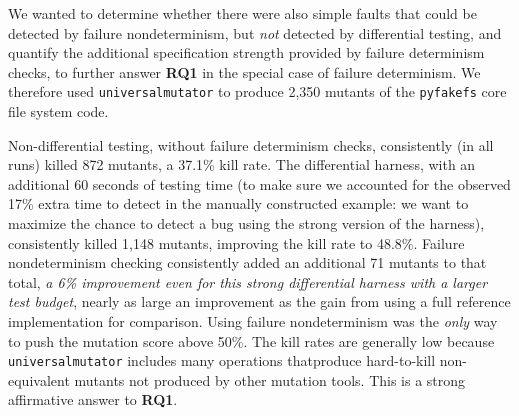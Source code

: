 {We wanted to determine whether there were also simple faults that
could be detected by failure nondeterminism, but \emph{not} detected
by differential testing, and quantify the additional specification
strength provided by failure determinism checks, to further answer
{\bf RQ1} in the special case of failure determinism.  We therefore used
{\tt universalmutator} \cite{RegExpMut} to produce 2,350 mutants of
the {\tt pyfakefs} core file system code.   %

Non-differential testing, without failure determinism checks,
consistently (in all runs) killed
872 mutants, a 37.1\% kill rate.
The differential harness, with an additional 60 seconds of testing
time (to make sure we accounted for the observed 17\%
extra time to detect in the manually constructed example: we want to
maximize the chance to detect a bug using the strong version of the harness), consistently killed 1,148 mutants, improving the kill rate to 48.8\%.  Failure
nondeterminism checking consistently added an
additional 71 mutants to that total, \emph{a 6\% improvement even for
this strong differential harness with a larger test budget}, nearly as
large an improvement as the gain from using a full reference
implementation for comparison.  Using
failure nondeterminism was the \emph{only} way to push the mutation score
above 50\%.  The kill rates are generally low
because {\tt universalmutator} includes many operations
thatproduce hard-to-kill
non-equivalent mutants not produced by other mutation tools.  This is a strong affirmative answer to {\bf
  RQ1}.

}
